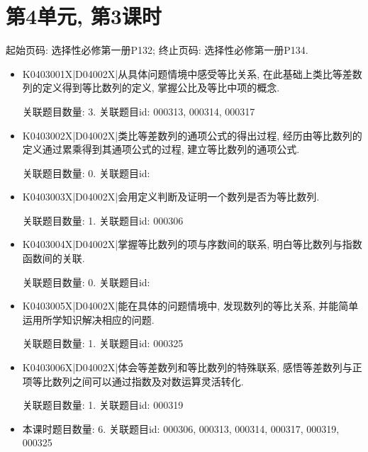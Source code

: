 \section*{第4单元, 第3课时}
起始页码: 选择性必修第一册P132; 终止页码: 选择性必修第一册P134.
\begin{itemize}
\item K0403001X|D04002X|从具体问题情境中感受等比关系, 在此基础上类比等差数列的定义得到等比数列的定义, 掌握公比及等比中项的概念.

关联题目数量: 3. 关联题目id: 000313, 000314, 000317

\item K0403002X|D04002X|类比等差数列的通项公式的得出过程, 经历由等比数列的定义通过累乘得到其通项公式的过程, 建立等比数列的通项公式.

关联题目数量: 0. 关联题目id: 

\item K0403003X|D04002X|会用定义判断及证明一个数列是否为等比数列.

关联题目数量: 1. 关联题目id: 000306

\item K0403004X|D04002X|掌握等比数列的项与序数间的联系, 明白等比数列与指数函数间的关联.

关联题目数量: 0. 关联题目id: 

\item K0403005X|D04002X|能在具体的问题情境中, 发现数列的等比关系, 并能简单运用所学知识解决相应的问题.

关联题目数量: 1. 关联题目id: 000325

\item K0403006X|D04002X|体会等差数列和等比数列的特殊联系, 感悟等差数列与正项等比数列之间可以通过指数及对数运算灵活转化.

关联题目数量: 1. 关联题目id: 000319

\item 本课时题目数量: 6. 关联题目id: 000306, 000313, 000314, 000317, 000319, 000325

\end{itemize}

